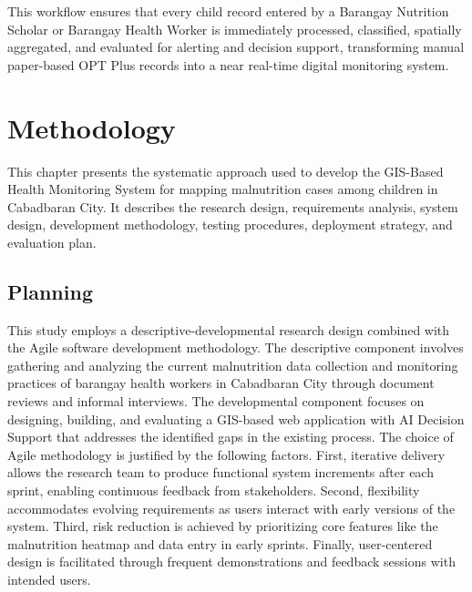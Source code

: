 \documentclass[12pt, a4paper]{report}
\begin{document}
This workflow ensures that every child record entered by a Barangay Nutrition Scholar or Barangay Health Worker is immediately processed, classified, spatially aggregated, and evaluated for alerting and decision support, transforming manual paper-based OPT Plus records into a near real-time digital monitoring system.

\clearpage

\chapter{Methodology}
\label{chap:methodology}

This chapter presents the systematic approach used to develop the GIS-Based Health Monitoring System for mapping malnutrition cases among children in Cabadbaran City. It describes the research design, requirements analysis, system design, development methodology, testing procedures, deployment strategy, and evaluation plan.

\section{Planning}
\label{sec:planning}
This study employs a descriptive-developmental research design combined with the Agile software development methodology. The descriptive component involves gathering and analyzing the current malnutrition data collection and monitoring practices of barangay health workers in Cabadbaran City through document reviews and informal interviews. The developmental component focuses on designing, building, and evaluating a GIS-based web application with AI Decision Support that addresses the identified gaps in the existing process.
The choice of Agile methodology is justified by the following factors. First, iterative delivery allows the research team to produce functional system increments after each sprint, enabling continuous feedback from stakeholders. Second, flexibility accommodates evolving requirements as users interact with early versions of the system. Third, risk reduction is achieved by prioritizing core features like the malnutrition heatmap and data entry in early sprints. Finally, user-centered design is facilitated through frequent demonstrations and feedback sessions with intended users.
\end{document}
